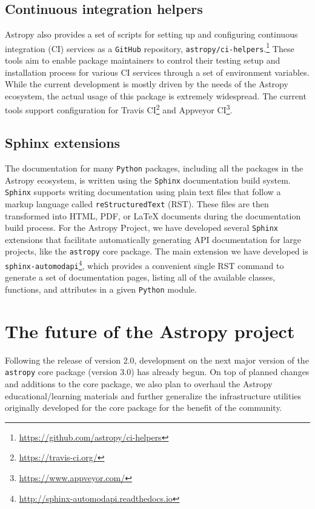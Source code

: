 \documentclass[modern]{aastex62}
\newcommand{\package}[1]{\texttt{#1}\xspace}
\newcommand{\github}{\package{GitHub}}
\newcommand{\python}{\package{Python}}
\newcommand{\astropy}{Astropy\xspace}
\newcommand{\astropypkg}{\package{astropy}}
\begin{document}
\subsection{Continuous integration helpers}

\astropy also provides a set of scripts for setting up and configuring
continuous integration (CI) services as a \github repository,
\package{astropy/ci-helpers}.\footnote{\url{https://github.com/astropy/ci-helpers}}
These tools aim to enable package maintainers to control their testing setup
and installation process for various CI services through a
set of environment variables.
While the current development is mostly driven by the needs of the \astropy
ecosystem, the actual usage of this package is extremely widespread. The current
tools support configuration for Travis CI\footnote{\url{https://travis-ci.org/}} and
Appveyor CI\footnote{\url{https://www.appveyor.com/}}.

\subsection{Sphinx extensions}

The documentation for many \python packages, including
all the packages in the \astropy ecosystem, is written using the
\package{Sphinx} documentation build system.
\package{Sphinx} supports writing documentation using plain text files
that follow a markup language called \texttt{reStructuredText} (RST).
These files are then transformed into HTML, PDF, or \LaTeX{} documents
during the documentation build process.
For the \astropy Project, we have developed several \package{Sphinx} extensions
that facilitate automatically generating API documentation for large projects,
like the \astropypkg core package.
The main extension we have developed is
\package{sphinx-automodapi}\footnote{\url{http://sphinx-automodapi.readthedocs.io}},
which provides a convenient single RST command to generate a set of
documentation pages, listing all of the available classes, functions, and
attributes in a given \python module.

\section{The future of the Astropy project}
\label{sec:future}

Following the release of version 2.0, development on the next major version of
the \astropypkg core package (version 3.0) has already begun.
On top of planned changes and additions to the core package, we also plan to
overhaul the \astropy educational/learning materials and further
generalize the infrastructure utilities originally developed for the core
package for the benefit of the community.
\end{document}
